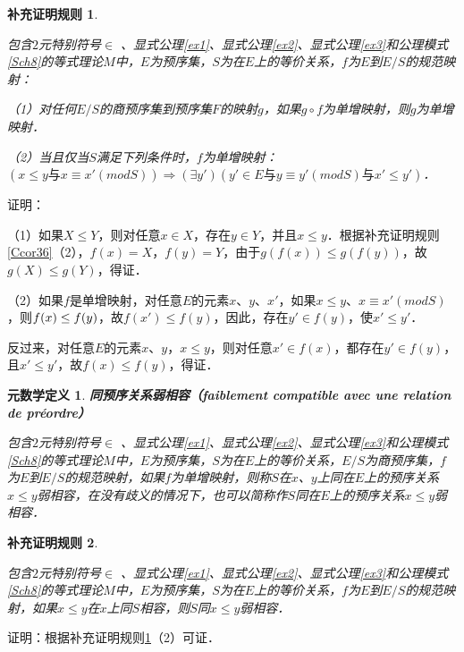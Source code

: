 \documentclass[12pt, a4paper, oneside]{book}
\newtheorem{metadef}{元数学定义}
\newtheorem{Ccor}{补充证明规则}
\begin{document}
			\begin{Ccor}\label{Ccor82}
				\hfill\par
				包含$2$元特别符号$\in$ 、显式公理\ref{ex1}、显式公理\ref{ex2}、显式公理\ref{ex3}和公理模式\ref{Sch8}的等式理论$M$中，$E$为预序集，$S$为在$E$上的等价关系，$f$为$E$到$E/S$的规范映射：
				\par
				（1）对任何$E/S$的商预序集到预序集$F$的映射$g$，如果$g\circ f$为单增映射，则$g$为单增映射．
				\par
				（2）当且仅当$S$满足下列条件时，$f$为单增映射：	$(x\leq y\text{与}x\equiv x'(mod S))\Rightarrow(\exists y')(y'\in E\text{与}y\equiv y'(mod S)\text{与}x'\leq y')$．
			\end{Ccor}
			证明：
			\par
			（1）如果$X\leq Y$，则对任意$x\in X$，存在$y\in Y$，并且$x\leq y$．根据补充证明规则\ref{Ccor36}（2），$f(x)=X$，$f(y)=Y$，由于$g(f(x))\leq g(f(y))$，故$g(X) \leq g(Y)$，得证．
			\par
			（2）如果$f$是单增映射，对任意$E$的元素$x$、$y$、$x'$，如果$x\leq y$、$x\equiv x'(mod S)$，则$f(x)\\\leq f(y)$，故$f(x')\leq f(y)$，因此，存在$y'\in f(y)$，使$x' \leq y'$．
			\par
			反过来，对任意$E$的元素$x$、$y$，$x\leq y$，则对任意$x'\in f(x)$，都存在$y'\in f(y)$，且$x'\leq y'$，故$f(x)\leq f(y)$，得证．
			
			\begin{metadef}
				\textbf{同预序关系弱相容（faiblement compatible avec une relation de préordre）}
				\par
				包含$2$元特别符号$\in$ 、显式公理\ref{ex1}、显式公理\ref{ex2}、显式公理\ref{ex3}和公理模式\ref{Sch8}的等式理论$M$中，$E$为预序集，$S$为在$E$上的等价关系，$E/S$为商预序集，$f$为$E$到$E/S$的规范映射，如果$f$为单增映射，则称$S$在$x$、$y$上同在$E$上的预序关系$x\leq y$弱相容，在没有歧义的情况下，也可以简称作$S$同在$E$上的预序关系$x\leq y$弱相容．
			\end{metadef}
			
			\begin{Ccor}\label{Ccor83}
				\hfill\par
				包含$2$元特别符号$\in$ 、显式公理\ref{ex1}、显式公理\ref{ex2}、显式公理\ref{ex3}和公理模式\ref{Sch8}的等式理论$M$中，$E$为预序集，$S$为在$E$上的等价关系，$f$为$E$到$E/S$的规范映射，如果$x\leq y$在$x$上同$S$相容，则$S$同$x\leq y$弱相容．
			\end{Ccor}
			证明：根据补充证明规则\ref{Ccor82}（2）可证．
			
\end{document}
